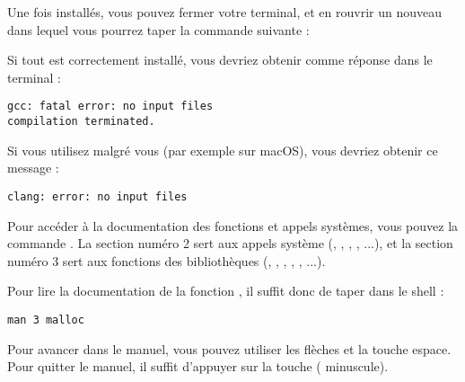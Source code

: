 \documentclass[11pt,a4paper]{article}
\begin{document}
\medskip

Une fois installés, vous pouvez fermer votre terminal, et en rouvrir un nouveau dans lequel vous pourrez taper la commande suivante :

\medskip


\medskip

Si tout est correctement installé, vous devriez obtenir comme réponse dans le terminal :

\medskip

\begin{lstlisting}[style=sh,morekeywords={floor,ceil}]
gcc: fatal error: no input files
compilation terminated. \end{lstlisting}


Si vous utilisez  malgré vous (par exemple sur macOS), vous devriez obtenir ce message :

\medskip

\begin{lstlisting}[style=sh,morekeywords={floor,ceil}]
clang: error: no input files \end{lstlisting}

\bigskip

Pour accéder à la documentation des fonctions et appels systèmes, vous pouvez la commande .
La section numéro 2 sert aux appels système (, , , , ...), et la section numéro 3 sert aux fonctions des bibliothèques (, , , , , ...).

\medskip

Pour lire la documentation de la fonction , il suffit donc de taper dans le shell :

\medskip

\begin{lstlisting}[style=sh,morekeywords={floor,ceil}]
man 3 malloc\end{lstlisting}

Pour avancer dans le manuel, vous pouvez utiliser les flèches et la touche espace.
Pour quitter le manuel, il suffit d'appuyer sur la touche  ( minuscule).
\end{document}
